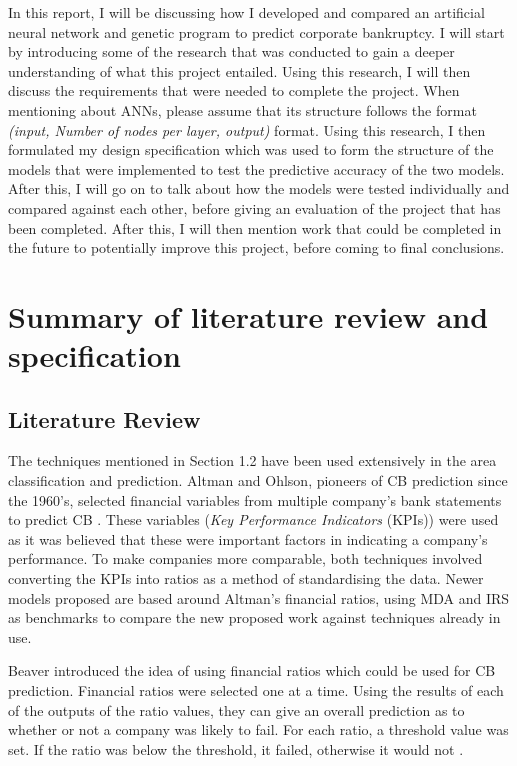 \documentclass[11pt]{article}
\begin{document}
In this report, I will be discussing how I developed and compared an artificial neural network and genetic program to predict corporate bankruptcy.  I will start by introducing some of the research that was conducted to gain a deeper understanding of what this project entailed. Using this research, I will then discuss the requirements that were needed to complete the project. When mentioning about ANNs, please assume that its structure follows the format \textit{(input, Number of nodes per layer, output)} format. Using this research, I then formulated my design specification which was used to form the structure of the models that were implemented to test the predictive accuracy of the two models. After this, I will go on to talk about how the models were tested individually and compared against each other, before giving an evaluation of the project that has been completed. After this, I will then mention work that could be completed in the future to potentially improve this project, before coming to final conclusions. 
\section{Summary of literature review and specification}\label{sec:spec}
\subsection{Literature Review}\label{subsec:litrev}
The techniques mentioned in Section 1.2 have been used extensively in the area classification and prediction. Altman and Ohlson, pioneers of CB prediction since the 1960's, selected financial variables from multiple company's bank statements to predict CB \cite{ref-six,ref-eight}. These variables (\textit{Key Performance Indicators} (KPIs)) were used as it was believed that these were important factors in indicating a company's performance. To make companies more comparable, both techniques involved converting the KPIs into ratios as a method of standardising the data. Newer models proposed are based around Altman's financial ratios, using MDA and IRS as benchmarks to compare the new proposed work against techniques already in use. 

Beaver introduced the idea of using financial ratios which could be used for CB prediction. Financial ratios were selected one at a time. Using the results of each of the outputs of the ratio values, they can give an overall prediction as to whether or not a company was likely to fail. For each ratio, a threshold value was set. If the ratio was below the threshold, it failed, otherwise it would not \cite{ref-two}.
\end{document}
